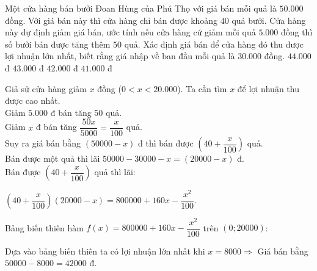 \begin{ex}%
Một cửa hàng bán bưởi Đoan Hùng của Phú Thọ với giá bán mỗi quả là $50.000$ đồng. Với giá bán này thì cửa hàng chỉ bán được khoảng $40$ quả bưởi. Cửa hàng này dự định giảm giá bán, ước tính nếu cửa hàng cứ giảm mỗi quả $5.000$ đồng thì số bưởi bán được tăng thêm $50$ quả. Xác định giá bán để cửa hàng đó thu được lợi nhuận lớn nhất, biết rằng giá nhập về ban đầu mỗi quả là $30.000$ đồng.
\choice
{$44.000$ đ}
{$43.000$ đ}
{\True $42.000$ đ}
{$41.000$ đ}
\loigiai
{Giả sử cửa hàng giảm $x$ đồng ($0<x<20.000$). Ta cần tìm $x$ để lợi nhuận thu được cao nhất.\\
Giảm $5.000$ đ bán tăng $50$ quả.\\
Giảm $x$ đ bán tăng $\dfrac{50x}{5000}=\dfrac{x}{100}$ quả.\\
Suy ra giá bán bằng $(50000-x)$ đ thì bán được $\left(40+\dfrac{x}{100}\right)$ quả.\\
Bán được một quả thì lãi $50000-30000-x=(20000-x)$ đ.\\
Bán được $\left(40+\dfrac{x}{100}\right)$ quả thì lãi:
\begin{center}
$\left(40+\dfrac{x}{100}\right)(20000-x)=800000+160x-\dfrac{x^2}{100}$.
\end{center}
Bảng biến thiên hàm $f(x)=800000+160x-\dfrac{x^2}{100}$ trên $(0; 20000)$:
\begin{center}
\end{center}
Dựa vào bảng biến thiên ta có lợi nhuận lớn nhất khi $x=8000\Rightarrow$ Giá bán bằng $50000-8000=42000$ đ.
}
\end{ex}


